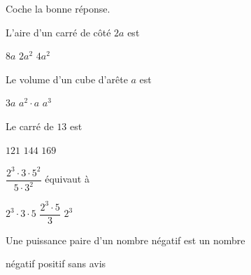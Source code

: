 %
%
Coche la bonne réponse.\par
	\begin{tasks}
		\task L'aire d'un carré de côté $2a$ est
		\begin{qcm}
			\choice $8a$
			\choice $2a^2$
			\correct $4a^2$
		\end{qcm}

		\task Le volume d'un cube d'arête $a$ est
		\begin{qcm}
			\choice $3a$
			\choice $a^2 \cdot a$
			\correct $a^3$
		\end{qcm}

		\task Le carré de $13$ est
		\begin{qcm}
			\choice $121$
			\choice $144$
			\correct $169$
		\end{qcm}

		\task $\dfrac{2^3\cdot 3\cdot 5^2}{5\cdot 3^2}$ équivaut à
		\begin{qcm}
			\correct $2^3\cdot 3\cdot 5$
			\choice $\dfrac{2^3\cdot5}{3}$
			\choice $2^3$
		\end{qcm}

		\task Une puissance paire d'un nombre négatif est un nombre
		\begin{qcm}
			\choice négatif
			\correct positif
			\choice sans avis
		\end{qcm}
	\end{tasks}
